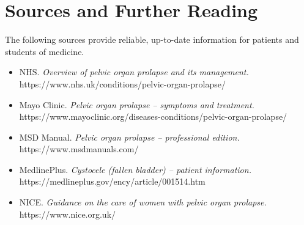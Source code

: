 \section*{Sources and Further Reading}
The following sources provide reliable, up-to-date information for patients and students of medicine.

\begin{itemize}
    \item NHS. \textit{Overview of pelvic organ prolapse and its management.} https://www.nhs.uk/conditions/pelvic-organ-prolapse/
    \item Mayo Clinic. \textit{Pelvic organ prolapse -- symptoms and treatment.} https://www.mayoclinic.org/diseases-conditions/pelvic-organ-prolapse/
    \item MSD Manual. \textit{Pelvic organ prolapse -- professional edition.} https://www.msdmanuals.com/
    \item MedlinePlus. \textit{Cystocele (fallen bladder) -- patient information.} https://medlineplus.gov/ency/article/001514.htm
    \item NICE. \textit{Guidance on the care of women with pelvic organ prolapse.} https://www.nice.org.uk/
\end{itemize}
